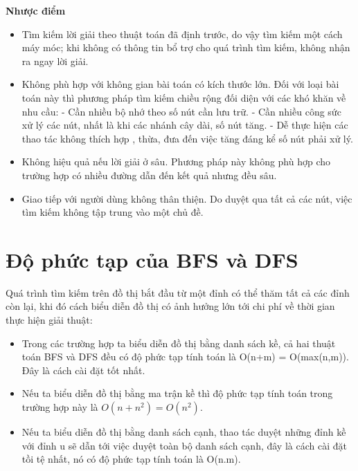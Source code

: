 \textbf{Nhược điểm}
\begin{itemize}
	\item Tìm kiếm lời giải theo thuật toán đã định trước, do vậy tìm kiếm một cách
	máy móc; khi không có thông tin bổ trợ cho quá trình tìm kiếm, không nhận
	ra ngay lời giải.
	\item Không phù hợp với không gian bài toán có kích thước lớn. Đối với loại bài
	toán này thì phương pháp tìm kiếm chiều rộng đối diện với các khó khăn về
	nhu cầu:
		\subitem - Cần nhiều bộ nhớ theo số nút cần lưu trữ.
		\subitem - Cần nhiều công sức xử lý các nút, nhất là khi các nhánh cây dài, số
		nút tăng.
		\subitem - Dễ thực hiện các thao tác không thích hợp , thừa, đưa đến việc tăng
		đáng kể số nút phải xử lý.
	\item Không hiệu quả nếu lời giải ở sâu. Phương pháp này không phù hợp cho
	trường hợp có nhiều đường dẫn đến kết quả nhưng đều sâu.
	\item Giao tiếp với người dùng không thân thiện. Do duyệt qua tất cả các nút,
	việc tìm kiếm không tập trung vào một chủ đề.
\end{itemize}

\section{Độ phức tạp của BFS và DFS}
Quá trình tìm kiếm trên đồ thị bắt đầu từ một đỉnh có thể thăm tất cả các đỉnh còn
lại, khi đó cách biểu diễn đồ thị có ảnh hưởng lớn tới chi phí về thời gian thực hiện
giải thuật:
\begin{itemize}
	\item Trong các trường hợp ta biểu diễn đồ thị bằng danh sách kề, cả hai thuật
	toán BFS và DFS đều có độ phức tạp tính toán là O(n+m) = O(max(n,m)).
	Đây là cách cài đặt tốt nhất.
	\item Nếu ta biểu diễn đồ thị bằng ma trận kề thì độ phức tạp tính toán trong
	trường hợp này là $O(n+n^2) = O(n^2).$
	\item Nếu ta biểu diễn đồ thị bằng danh sách cạnh, thao tác duyệt những đỉnh kề
	với đỉnh u sẽ dẫn tới việc duyệt toàn bộ danh sách cạnh, đây là cách cài đặt
	tồi tệ nhất, nó có độ phức tạp tính toán là O(n.m).
\end{itemize}





